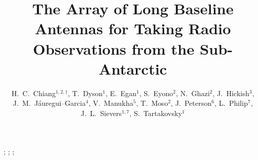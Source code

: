 \documentclass{ws-jai}
\begin{document}
\catchline{}{}{}{}{} %


\title{The Array of Long Baseline Antennas for Taking Radio
  Observations from the Sub-Antarctic}

\author{H.~C.~Chiang$^{1,2,\dagger}$, T.~Dyson$^{1}$, E.~Egan$^{1}$,
  S.~Eyono$^{2}$, N.~Ghazi$^{2}$, J.~Hickish$^{3}$,
  J.~M.~J\'auregui--Garcia$^{4}$, V.~Manukha$^{5}$, T.~Moso$^{2}$,
  J.~Peterson$^{6}$, L.~Philip$^{7}$, J.~L.~Sievers$^{1,7}$,
  S.~Tartakovsky$^{1}$}

\address{
$^{1}$Department of Physics, McGill University, Montr\'eal, Quebec H3A 2T8, Canada\\
$^{2}$School of Mathematics, Statistics, and Computer Science,
  University of KwaZulu--Natal, Durban 4000, South Africa\\
$^{3}$Department of Astronomy, University of California, Berkeley,
  California 94720, USA\\
$^{4}$Canadian Institute for Theoretical Astrophysics, Toronto, Ontario M5R 2M8, Canada \\
$^{5}$South African National Space Agency, Hermanus 7200, South Africa\\
$^{6}$Department of Physics, Carnegie Mellon University,
  Pittsburgh, Pennsylvania 15213, USA\\
$^{7}$School of Chemistry and Physics,
  University of KwaZulu--Natal, Durban 4000, South Africa
}

\maketitle


\begin{history}
;
;
;
\end{history}
\end{document}
